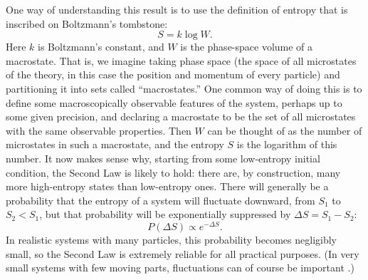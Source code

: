 \documentclass[12pt,letterpaper]{article}
\newcommand{\be}{\begin{equation}}
\newcommand{\ee}{\end{equation}}
\begin{document}
One way of understanding this result is to use the definition of entropy that is inscribed on Boltzmann's tombstone:
\be
  S = k \log W.
\ee
Here $k$ is Boltzmann's constant, and $W$ is the phase-space volume of a macrostate.
That is, we imagine taking phase space (the space of all microstates of the theory, in this case the position and momentum of every particle) and partitioning it into sets called ``macrostates.''
One common way of doing this is to define some macroscopically observable features of the system, perhaps up to some given precision, and declaring a macrostate to be the set of all microstates with the same observable properties.
Then $W$ can be thought of as the number of microstates in such a macrostate, and the entropy $S$ is the logarithm of this number.
It now makes sense why, starting from some low-entropy initial condition, the Second Law is likely to hold: there are, by construction, many more high-entropy states than low-entropy ones.
There will generally be a probability that the entropy of a system will fluctuate downward, from $S_1$ to $S_2 < S_1$, but that probability will be exponentially suppressed by $\Delta S = S_1 - S_2$:
\be
  P(\Delta S) \propto e^{-\Delta S}.
  \label{deltaS}
\ee
In realistic systems with many particles, this probability becomes negligibly small, so the Second Law is extremely reliable for all practical purposes.
(In very small systems with few moving parts, fluctuations can of course be important \cite{evanssearles,jarzynski}.)
\end{document}
